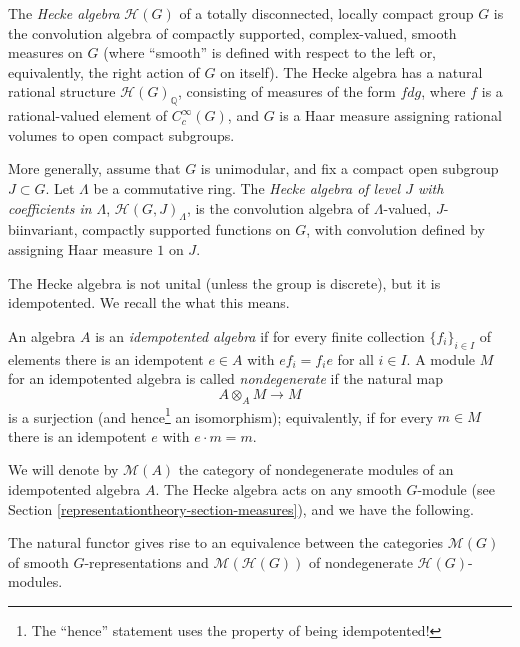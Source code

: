 \begin{definition}
	\label{definition-Hecke-algebra}
The {\it Hecke algebra} $\mathcal H(G)$ of a totally disconnected, locally compact group $G$ is the convolution algebra of compactly supported, complex-valued, smooth measures on $G$ (where ``smooth'' is defined with respect to the left or, equivalently, the right action of $G$ on itself). The Hecke algebra has a natural rational structure $\mathcal H(G)_{\mathbb Q}$, consisting of measures of the form $f dg$, where $f$ is a rational-valued element of $C_c^\infty(G)$, and $G$ is a Haar measure assigning rational volumes to open compact subgroups.

More generally, assume that $G$ is unimodular, and fix a compact open subgroup $J\subset G$. Let $\Lambda$ be a commutative ring. The {\it Hecke algebra of level $J$ with coefficients in $\Lambda$}, $\mathcal H(G,J)_\Lambda$, is the convolution algebra of $\Lambda$-valued, $J$-biinvariant, compactly supported functions on $G$, with convolution defined by assigning Haar measure $1$ on $J$. 
\end{definition}

The Hecke algebra is not unital (unless the group is discrete), but it is idempotented. We recall the what this means. 

\begin{definition}
	\label{definition-idempotented-algebra}
An algebra $A$ is an {\it idempotented algebra} if for every finite collection $\{f_i\}_{i\in I}$ of elements there is an idempotent $e\in A$ with $ef_i = f_ie$ for all $i\in I$. A module $M$ for an idempotented algebra is called {\it nondegenerate} if the natural map 
\begin{equation}
\label{equation-tensor-action}
A\otimes_A M \to M
\end{equation}	
is a surjection (and hence\footnote{The ``hence'' statement uses the property of being idempotented!} an isomorphism); equivalently, if for every $m\in M$ there is an idempotent $e$ with $e\cdot m = m$. 
\end{definition}

We will denote by $\mathcal M(A)$ the category of nondegenerate modules of an idempotented algebra $A$.
The Hecke algebra acts on any smooth $G$-module (see Section \ref{representationtheory-section-measures}), and we have the following.

\begin{proposition}
	\label{proposition-equivalence-Hecke}
	The natural functor gives rise to an equivalence between the categories $\mathcal M(G)$ of smooth $G$-representations and $\mathcal M(\mathcal H(G))$ of nondegenerate $\mathcal H(G)$-modules.
\end{proposition}

